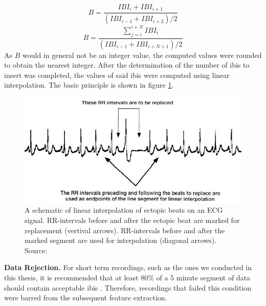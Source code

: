 \begin{equation}\label{Bsingle}
B = \frac{IBI_{i}+IBI_{i+1}}{(IBI_{i-1}+IBI_{i+2})/2}
\end{equation}
\begin{equation}\label{Bseq}
B = \frac{\sum_{j=i}^{i+N} IBI_{i}}{(IBI_{i-1}+IBI_{i+N+1})/2}
\end{equation}
As $B$ would in general not be an integer value, the computed values were rounded to obtain the nearest integer. After the determination of the number of \gls{ibi}s to insert was completed, the values of said \gls{ibi}s were computed using linear interpolation. The basic principle is shown in figure \ref{ebrep}.

\begin{figure}[h!]
	\centering
  \includegraphics[width=1.0\textwidth, angle=0]{images/eb_replacement.jpg}
	\caption[Linear Interpolation of Ectopic Beats]{A schematic of linear interpolation of ectopic beats on an ECG signal. RR-intervals before and after the ectopic beat are marked for replacement (vertival arrows). RR-intervals before and after the marked segment are used for interpolation (diagonal arrows). Source: \cite{Lippman1994}}
	\label{ebrep}
\end{figure}
\textbf{Data Rejection.} For short term recordings, such as the ones we conducted in this thesis, it is recommended that at least 80\% of a 5 minute segment of data should contain acceptable \gls{ibi}s \cite{Clifford2002}. Therefore, recordings that failed this condition were barred from the subsequent feature extraction.


\newpage
